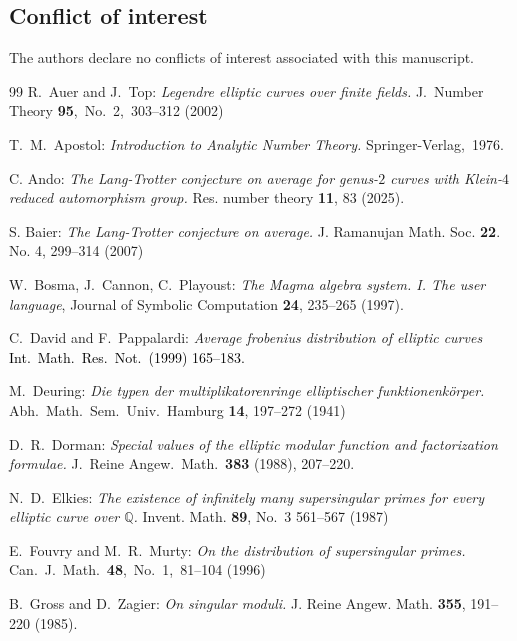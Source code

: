 \documentclass[a4paper, 11pt]{article}
\theoremstyle{plain}
\newcommand{\?}{\textcolor{red}{??}}
\begin{document}
\subsection*{Conflict of interest}
The authors declare no conflicts of interest associated with this manuscript.
\begin{thebibliography}{99}
R.\ Auer and J.\ Top:
\textit{Legendre elliptic curves over finite fields.}
J.\ Number Theory {\bf 95},\ No.\ 2,\ 303--312 (2002)

T.\ M.\ Apostol: \textit{Introduction to Analytic Number Theory.}
Springer-Verlag,\ 1976.

C. Ando:
\textit{The Lang-Trotter conjecture on average for genus-$2$ curves with Klein-$4$ reduced automorphism group.}
Res. number theory {\bf 11}, 83 (2025).

S. Baier:
\textit{The Lang-Trotter conjecture on average.}
J. Ramanujan Math. Soc. {\bf 22}. No. 4, 299--314 (2007)

W.\ Bosma, J.\ Cannon, C.\ Playoust: \textit{The Magma algebra system. I. The user language}, Journal of Symbolic Computation {\bf 24}, 235--265  (1997). %



C.\ David and F.\ Pappalardi:
\textit{Average frobenius distribution of elliptic curves}
\textcolor{black}{
Int.\ Math.\ Res.\ Not.\ (1999) 165--183.}

M.\ Deuring:
\textit{Die typen der multiplikatorenringe elliptischer funktionenk\"{o}rper.}
Abh.\ Math.\ Sem.\ Univ.\ Hamburg  {\bf 14}, 197--272 (1941) 

D.\ R.\ Dorman:
\textit{Special values of the elliptic modular function and factorization formulae.}
J.\ Reine Angew.\ Math.\ {\bf 383} (1988), 207--220.

N.\ D.\ Elkies: 
\textit{The existence of infinitely many supersingular primes for every elliptic curve over $\mathbb Q$.} 
Invent. Math. {\bf 89}, No.\ 3 561--567 (1987)


E.\ Fouvry and M.\ R.\ Murty:
\textit{On the distribution of supersingular primes.}
Can.\ J.\ Math.\ {\bf 48},\ No.\ 1,\ 81--104 (1996)

B.\ Gross and D.\ Zagier:
{\it On singular moduli.}
J. Reine Angew. Math. {\bf 355}, 191--220 (1985).



\end{thebibliography}
\end{document}
